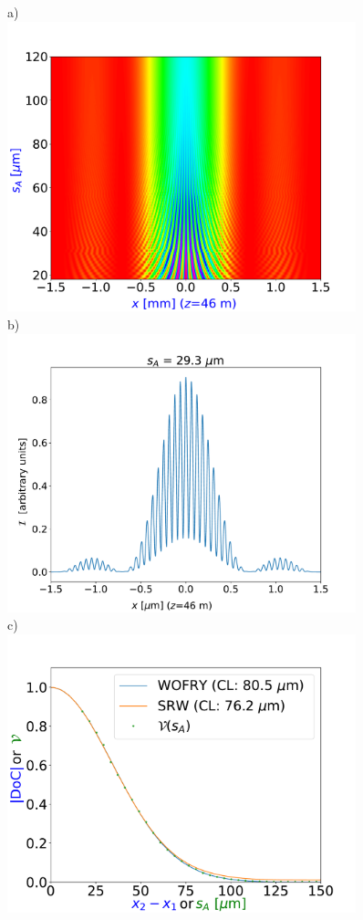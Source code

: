 \documentclass{iucr}              %
\begin{document}
\begin{figure}
    \label{fig:doubleslit}
    a)~~~~~~~~~~~~~~~~~~~~~~~~~~~~~~~~~~~~~\newline
    \includegraphics[width=0.90\textwidth]{figures/doubleslit_scan.pdf}
    b)~~~~~~~~~~~~~~~~~~~~~~~~~~~~~~~~~~~~~\newline
    \includegraphics[width=0.90\textwidth]{figures/doubleslit_profile.pdf}
    c)~~~~~~~~~~~~~~~~~~~~~~~~~~~~~~~~~~~~~\newline
    \includegraphics[width=0.90\textwidth]{figures/doubleslit_DoC.pdf}

\end{figure}
\end{document}
